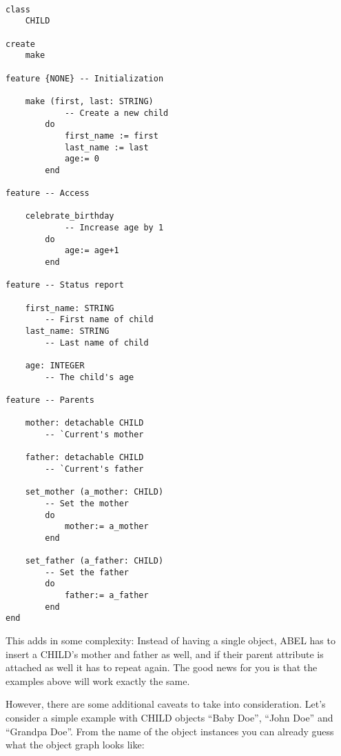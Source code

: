 \begin{lstlisting}[language=OOSC2Eiffel, captionpos=b, caption={The CHILD class}, label={lst:child_class}]

class 
	CHILD

create
	make

feature {NONE} -- Initialization

	make (first, last: STRING)
			-- Create a new child
		do
			first_name := first
			last_name := last
			age:= 0
		end

feature -- Access

	celebrate_birthday
			-- Increase age by 1
		do
			age:= age+1
		end

feature -- Status report

	first_name: STRING
		-- First name of child
	last_name: STRING
		-- Last name of child

	age: INTEGER
		-- The child's age

feature	-- Parents 

	mother: detachable CHILD
		-- `Current's mother

	father: detachable CHILD
		-- `Current's father
	
	set_mother (a_mother: CHILD)
		-- Set the mother
		do
			mother:= a_mother
		end

	set_father (a_father: CHILD)
		-- Set the father
		do
			father:= a_father
		end
end
\end{lstlisting}


This adds in some complexity: 
Instead of having a single object, ABEL has to insert a CHILD's mother and father as well, and if their parent attribute is attached as well it has to repeat again.
The good news for you is that the examples above will work exactly the same.

However, there are some additional caveats to take into consideration. 
Let's consider a simple example with CHILD objects ``Baby Doe'', ``John Doe'' and ``Grandpa Doe''.
From the name of the object instances you can already guess what the object graph looks like: 

	\begin{center}
	\end{center}

